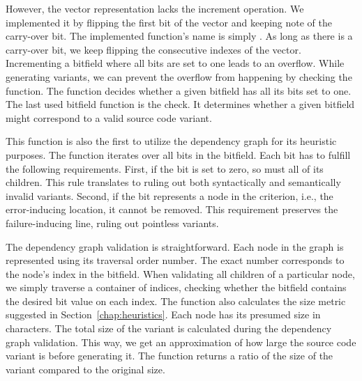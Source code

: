 However, the vector representation lacks the increment operation. 
We implemented it by flipping the first bit of the vector and keeping 
note of the carry-over bit. 
The implemented function's name is simply . 
As long as there is a carry-over bit, we keep flipping the consecutive 
indexes of the vector. 
Incrementing a bitfield where all bits are set to one leads to an overflow. 
While generating variants, we can prevent the overflow from happening by 
checking the  function. 
The function decides whether a given bitfield has all its bits set to one. 
The last used bitfield function is the  check. 
It determines whether a given bitfield might correspond to a valid source 
code variant. 

This function is also the first to utilize the dependency graph for its 
heuristic purposes. 
The function iterates over all bits in the bitfield. 
Each bit has to fulfill the following requirements. 
First, if the bit is set to zero, so must all of its children. 
This rule translates to ruling out both syntactically and semantically 
invalid variants. 
Second, if the bit represents a node in the criterion, i.e., 
the error-inducing location, it cannot be removed. 
This requirement preserves the failure-inducing line, ruling out pointless 
variants. 

The dependency graph validation is straightforward. 
Each node in the graph is represented using its traversal order number.
The exact number corresponds to the node's index in the bitfield. 
When validating all children of a particular node, we simply traverse 
a container of indices, checking whether the bitfield contains the desired 
bit value on each index.
The  function also calculates the size metric suggested in 
Section~\ref{chap:heuristics}. 
Each node has its presumed size in characters. 
The total size of the variant is calculated during the dependency graph 
validation. 
This way, we get an approximation of how large the source code variant is 
before generating it. 
The function returns a ratio of the size of the variant compared to 
the original size. 

